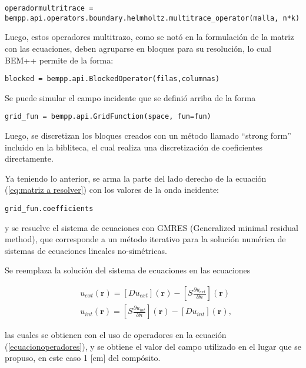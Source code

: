 \documentclass[12pt,letterpaper]{report}
\numberwithin{equation}{section}
\begin{document}
\begin{lstlisting}
operadormultritrace = bempp.api.operators.boundary.helmholtz.multitrace_operator(malla, n*k)
\end{lstlisting}

Luego, estos operadores multitrazo, como se notó en la formulación de la matriz con las ecuaciones, deben agruparse en bloques para su resolución, lo cual BEM++ permite de la forma: 

\begin{lstlisting}
blocked = bempp.api.BlockedOperator(filas,columnas)
\end{lstlisting}

Se puede simular el campo incidente que se definió arriba de la forma 

\begin{lstlisting}
grid_fun = bempp.api.GridFunction(space, fun=fun)
\end{lstlisting}

Luego, se discretizan los bloques creados con un método llamado ``strong form'' incluido en la bibliteca, el cual realiza una discretización de coeficientes directamente. 

Ya teniendo lo anterior, se arma la parte del lado derecho de la ecuación (\ref{eq:matriz a resolver}) con los valores de la onda incidente:

\begin{lstlisting}
grid_fun.coefficients
\end{lstlisting} 

\noindent y se resuelve el sistema de ecuaciones con GMRES (Generalized minimal residual method), que corresponde a un método iterativo para la solución numérica de sistemas de ecuaciones lineales no-simétricas.

Se reemplaza la solución del sistema de ecuaciones en las ecuaciones 

\begin{equation}
\begin{split}
&u_{ext}(\textbf{r})=\left[D u_{ext}\right](\textbf{r}) - \left[S \frac{\partial u_{ext}}{\partial n}\right](\textbf{r})\\
&u_{int}(\textbf{r})= \left[S \frac{\partial u_{int}}{\partial n}\right](\textbf{r}) - \left[D u_{int}\right](\textbf{r}),
\end{split}
\label{eq: BIE_potencial}
\end{equation}

\noindent las cuales se obtienen con el uso de operadores en la ecuación (\ref{ecuacionoperadores}), y se obtiene el valor del campo utilizado en el lugar que se propuso, en este caso  1 [cm] del compósito.
\end{document}
